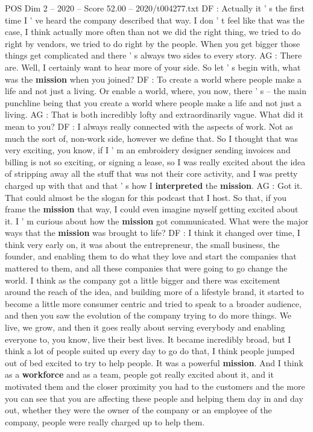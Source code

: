 \begin{textsample}{POS Dim 2 – 2020 – Score 52.00 – 2020/t004277.txt}
DF : Actually it ' s the first time I ' ve heard the company described that way.
I don ' t feel like that was the case, I think actually more often than not we did the right thing, we tried to do right by vendors, we tried to do right by the people.
When you get bigger those things get complicated and there ' s always two sides to every story.
AG : There are.
Well, I certainly want to hear more of your side.
So let ' s begin with, what was the \textbf{mission} when you joined?
DF : To create a world where people make a life and not just a living.
Or enable a world, where, you now, there ' s -- the main punchline being that you create a world where people make a life and not just a living.
AG : That is both incredibly lofty and extraordinarily vague.
What did it mean to you?
DF : I always really connected with the aspects of work.
Not as much the sort of, non-work side, however we define that.
So I thought that was very exciting, you know, if I ' m an embroidery designer sending invoices and billing is not so exciting, or signing a lease, so I was really excited about the idea of stripping away all the stuff that was not their core activity, and I was pretty charged up with that and that ' s how I \textbf{interpreted} the \textbf{mission}.
AG : Got it.
That could almost be the slogan for this podcast that I host.
So that, if you frame the \textbf{mission} that way, I could even imagine myself getting excited about it.
I ' m curious about how the \textbf{mission} got communicated.
What were the major ways that the \textbf{mission} was brought to life?
DF : I think it changed over time, I think very early on, it was about the entrepreneur, the small business, the founder, and enabling them to do what they love and start the companies that mattered to them, and all these companies that were going to go change the world.
I think as the company got a little bigger and there was excitement around the reach of the idea, and building more of a lifestyle brand, it started to become a little more consumer centric and tried to speak to a broader audience, and then you saw the evolution of the company trying to do more things.
We live, we grow, and then it goes really about serving everybody and enabling everyone to, you know, live their best lives.
It became incredibly broad, but I think a lot of people suited up every day to go do that, I think people jumped out of bed excited to try to help people.
It was a powerful \textbf{mission}.
And I think as a \textbf{workforce} and as a team, people got really excited about it, and it motivated them and the closer proximity you had to the customers and the more you can see that you are affecting these people and helping them day in and day out, whether they were the owner of the company or an employee of the company, people were really charged up to help them.

\end{textsample}

